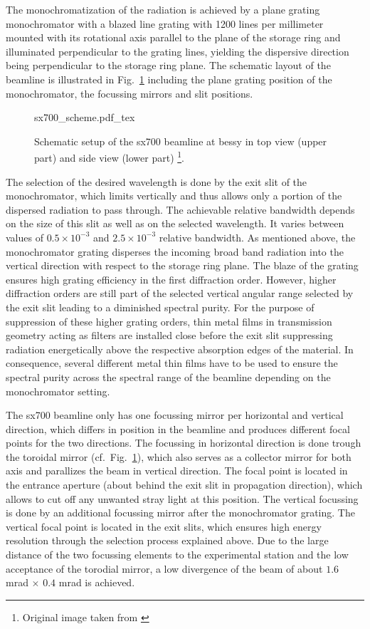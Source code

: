 The monochromatization of the radiation is achieved by a plane grating monochromator with a blazed line grating with 1200 lines per millimeter mounted with its rotational axis parallel to the plane of the storage ring and illuminated perpendicular to the grating lines, yielding the dispersive direction being perpendicular to the storage ring plane. The schematic layout of the beamline is illustrated in Fig.~\ref{ch_exp:fig_sx700_schematic} including the plane grating position of the monochromator, the focussing mirrors and slit positions.
\begin{figure}[htb]
    \def\svgwidth{\textwidth}
    {sx700_scheme.pdf_tex}
    \caption[Schematic setup of the SX700 beamline.]{Schematic setup of the \gls{sx700} beamline at \gls{bessy} in top view (upper part) and side view (lower part) \footnote{Original image taken from \textcite{scholze_high-accuracy_2001}}.}
    \label{ch_exp:fig_sx700_schematic}
\end{figure}
The selection of the desired wavelength is done by the exit slit of the monochromator, which limits vertically and thus allows only a portion of the dispersed radiation to pass through. The achievable relative bandwidth depends on the size of this slit as well as on the selected wavelength. It varies between values of $0.5\times 10^{-3}$ and $2.5\times 10^{-3}$ relative bandwidth. As mentioned above, the monochromator grating disperses the incoming broad band radiation into the vertical direction with respect to the storage ring plane. The blaze of the grating ensures high grating efficiency in the first diffraction order. However, higher diffraction orders are still part of the selected vertical angular range selected by the exit slit leading to a diminished spectral purity. For the purpose of suppression of these higher grating orders, thin metal films in transmission geometry acting as filters are installed close before the exit slit suppressing radiation energetically above the respective absorption edges of the material. In consequence, several different metal thin films have to be used to ensure the spectral purity across the spectral range of the beamline depending on the monochromator setting.

The \gls{sx700} beamline only has one focussing mirror per horizontal and vertical direction, which differs in position in the beamline and produces different focal points for the two directions. The focussing in horizontal direction is done trough the toroidal mirror (cf.~Fig.~\ref{ch_exp:fig_sx700_schematic}), which also serves as a collector mirror for both axis and parallizes the beam in vertical direction. The focal point is located in the entrance aperture (about  behind the exit slit in propagation direction), which allows to cut off any unwanted stray light at this position. The vertical focussing is done by an additional focussing mirror after the monochromator grating. The vertical focal point is located in the exit slits, which ensures high energy resolution through the selection process explained above. Due to the large distance of the two focussing elements to the experimental station and the low acceptance of the torodial mirror, a low divergence of the beam of about $1.6$ mrad $\times$ $0.4$ mrad is achieved.


